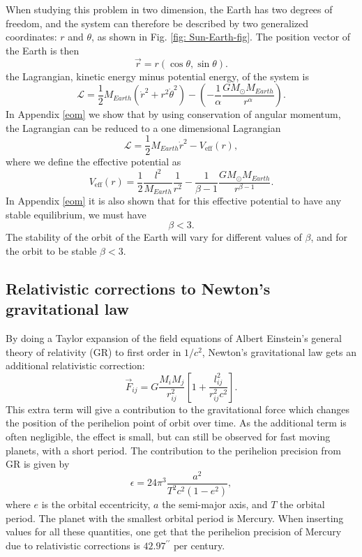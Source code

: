 \documentclass[%
 reprint,
nofootinbib,
aps,
]{revtex4-1}
\begin{document}
When studying this problem in two dimension, the Earth has two degrees of freedom, and the system can therefore be described by two generalized coordinates: $r$ and $\theta$, as shown in Fig. \ref{fig: Sun-Earth-fig}. The position vector of the Earth is then
\begin{equation}
\vec{r} = r(\cos\theta, \sin\theta).
\end{equation}
the Lagrangian, kinetic energy minus potential energy, of the system is
\begin{equation}
  \mathscr{L} = \frac{1}{2}M_{Earth}\left(\dot{r}^2 + r^2\dot{\theta}^2\right) - \left(-\frac{1}{\alpha}\frac{GM_\odot M_{Earth}}{r^\alpha}\right).
\end{equation}
In Appendix \ref{eom} we show that by using conservation of angular momentum, the Lagrangian can be reduced to a one dimensional Lagrangian
\begin{equation}
  \mathscr{L} = \frac{1}{2}M_{Earth}\dot{r}^2 - V_{\mathrm{eff}}(r),
\end{equation}
where we define the effective potential as
\begin{equation}\label{eq: effective_potential}
V_{\mathrm{eff}}(r) = \frac{1}{2}\frac{l^2}{M_{Earth}}\frac{1}{r^2} - \frac{1}{\beta - 1}\frac{GM_\odot M_{Earth}}{r^{\beta - 1}}.
\end{equation}
In Appendix \ref{eom} it is also shown that for this effective potential to have any stable equilibrium, we must have
\begin{equation}
\beta < 3.
\end{equation}
The stability of the orbit of the Earth will vary for different values of $\beta$, and for the orbit to be stable $\beta<3$.

\subsection{Relativistic corrections to Newton's gravitational law}\label{GR}

By doing a Taylor expansion of the field equations of Albert Einstein's general theory of relativity (GR) to first order in $1/c^2$, Newton's gravitational law gets an additional relativistic correction:
\begin{equation}
\vec{F}_{ij}= G\frac{M_i M_j}{r_{ij}^2}\left[ 1 + \frac{l_{ij}^2}{r_{ij}^2c^2} \right]. \label{GR_force}
\end{equation}
This extra term will give a contribution to the gravitational force which changes the position of the perihelion point of orbit over time. As the additional term is often negligible, the effect is small, but can still be observed for fast moving planets, with a short period. The contribution to the perihelion precision from GR is given by \cite{einstein}
\begin{equation}
\epsilon = 24\pi^3 \frac{a^2}{T^2c^2(1-e^2)},
\end{equation}
where $e$ is the orbital eccentricity, $a$ the semi-major axis, and $T$ the orbital period. The planet with the smallest orbital period is Mercury. When inserting values for all these quantities, one get that the perihelion precision of Mercury due to relativistic corrections is $42.97^{\prime\prime}$ per century.
\end{document}
